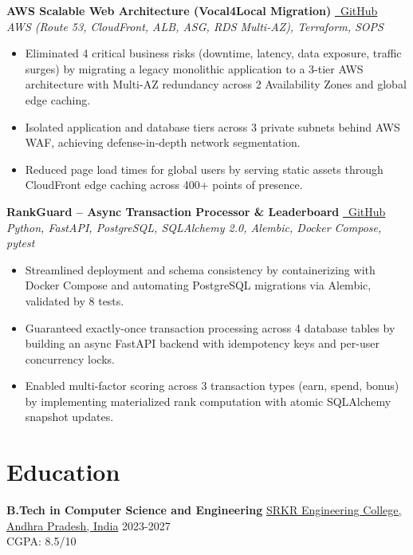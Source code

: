 \documentclass[10pt, letterpaper]{article}
\begin{document}
\vspace{3pt}
\noindent \textbf{AWS Scalable Web Architecture (Vocal4Local Migration)} \href{https://github.com/SoulByte07/AWS-Scalable-Web-Architecture}{\faGithub\ GitHub} \\
\textit{AWS (Route 53, CloudFront, ALB, ASG, RDS Multi-AZ), Terraform, SOPS}
\begin{itemize}
    \item Eliminated 4 critical business risks (downtime, latency, data exposure, traffic surges) by migrating a legacy monolithic application to a 3-tier AWS architecture with Multi-AZ redundancy across 2 Availability Zones and global edge caching.
    \item Isolated application and database tiers across 3 private subnets behind AWS WAF, achieving defense-in-depth network segmentation.
    \item Reduced page load times for global users by serving static assets through CloudFront edge caching across 400+ points of presence.
\end{itemize}

\vspace{3pt}
\noindent \textbf{RankGuard – Async Transaction Processor \& Leaderboard} \href{https://github.com/SoulByte07/RankGuard}{\faGithub\ GitHub} \\
\textit{Python, FastAPI, PostgreSQL, SQLAlchemy 2.0, Alembic, Docker Compose, pytest}
\begin{itemize}
    \item Streamlined deployment and schema consistency by containerizing with Docker Compose and automating PostgreSQL migrations via Alembic, validated by 8 tests.
    \item Guaranteed exactly-once transaction processing across 4 database tables by building an async FastAPI backend with idempotency keys and per-user concurrency locks.
    \item Enabled multi-factor scoring across 3 transaction types (earn, spend, bonus) by implementing materialized rank computation with atomic SQLAlchemy snapshot updates.
\end{itemize}

\section{Education}
\noindent \textbf{B.Tech in Computer Science and Engineering} \href{https://srkrec.edu.in/}{SRKR Engineering College, Andhra Pradesh, India} \hfill 2023-2027 \\
CGPA: 8.5/10
\end{document}
